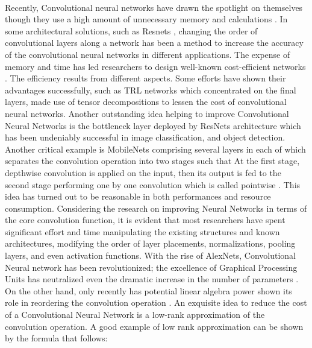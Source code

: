 \documentclass{report}
\begin{document}
\paragraph*{}
Recently, Convolutional neural networks have drawn the spotlight on themselves though they use a high amount of unnecessary memory and calculations
\cite{trl}. In some architectural solutions, such as Resnets
\cite{resnets}, changing the order of convolutional layers along a network has been a method to increase the accuracy of the convolutional neural networks in different applications. The expense of memory and time has led researchers to design well-known cost-efficient networks
\cite{resnets,mobilenets,alexnet,vgg}. The efficiency results from different aspects. Some efforts have shown their advantages successfully, such as TRL networks which concentrated on the final layers, made use of tensor decompositions to lessen the cost of convolutional neural networks\cite{trl}. Another outstanding idea helping to improve Convolutional Neural Networks is the bottleneck layer deployed by ResNets architecture which has been undeniably successful in image classification, and object detection\cite{resnets}. Another critical example is MobileNets comprising several layers in each of which separates the convolution operation into two stages\cite{mobilenets}  such that At the first stage, depthwise convolution is applied on the input, then its output is fed to the second stage performing one by one convolution which is called pointwise
\cite{depthwise}. This idea has turned out to be reasonable in both performances and resource consumption\cite{mobilenets}. Considering the research on improving Neural Networks in terms of the core convolution function\cite{convop1}, it is evident that most researchers have spent significant effort and time manipulating the existing structures and known architectures, modifying the order of layer placements, normalizations, pooling layers, and even activation functions. With the rise of AlexNets, Convolutional Neural network has been revolutionized; the excellence of Graphical Processing Units has neutralized even the dramatic increase in the number of parameters
\cite{gpu}
. On the other hand, only recently has potential linear algebra power shown its role in reordering the convolution operation
\cite{danish,convop1,trl}.
An exquisite idea to reduce the cost of a Convolutional Neural Network is a low-rank approximation of the convolution operation.
\cite{convop1}
A good example of low rank approximation can be shown by the formula that follows:
\end{document}
